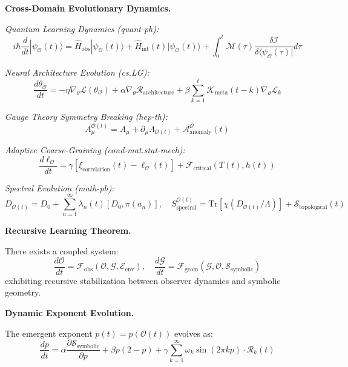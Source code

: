 \begin{scholium}
\vspace{1em}
\noindent\textbf{Cross-Domain Evolutionary Dynamics.}

\textit{Quantum Learning Dynamics (quant-ph):}
\[
i\hbar \frac{d}{dt}|\psi_{\mathcal{O}}(t)\rangle = \hat{H}_{\text{obs}}|\psi_{\mathcal{O}}(t)\rangle + \hat{H}_{\text{int}}(t)|\psi_{\mathcal{O}}(t)\rangle + \int_0^t \mathcal{M}(\tau) \frac{\delta \mathcal{I}}{\delta \langle \psi_{\mathcal{O}}(\tau)|} d\tau
\]

\textit{Neural Architecture Evolution (cs.LG):}
\[
\frac{d\theta_{\mathcal{O}}}{dt} = -\eta \nabla_\theta \mathcal{L}(\theta_{\mathcal{O}}) + \alpha \nabla_\theta \mathcal{R}_{\text{architecture}} + \beta \sum_{k=1}^{t} \mathcal{K}_{\text{meta}}(t-k) \nabla_\theta \mathcal{L}_k
\]

\textit{Gauge Theory Symmetry Breaking (hep-th):}
\[
A_\mu^{\mathcal{O}(t)} = A_\mu + \partial_\mu \Lambda_{\mathcal{O}(t)} + \mathcal{A}_{\text{anomaly}}^{\mathcal{O}}(t)
\]

\textit{Adaptive Coarse-Graining (cond-mat.stat-mech):}
\[
\frac{d\ell_{\mathcal{O}}}{dt} = \gamma[\xi_{\text{correlation}}(t) - \ell_{\mathcal{O}}(t)] + \mathcal{F}_{\text{critical}}(T(t), h(t))
\]

\textit{Spectral Evolution (math-ph):}
\[
D_{\mathcal{O}(t)} = D_0 + \sum_{n=1}^{\infty} \lambda_n(t) [D_0, \pi(a_n)], \quad S_{\text{spectral}}^{\mathcal{O}(t)} = \text{Tr}[\chi(D_{\mathcal{O}(t)}/\Lambda)] + \mathcal{S}_{\text{topological}}(t)
\]

\vspace{1em}
\noindent\textbf{Recursive Learning Theorem.}

\begin{theorem}
\label{thm:bk4_observer_geometry_coevolution}
There exists a coupled system:
\[
\frac{d\mathcal{O}}{dt} = \mathcal{F}_{\text{obs}}(\mathcal{O}, \mathcal{G}, \mathcal{E}_{\text{env}}), \quad \frac{d\mathcal{G}}{dt} = \mathcal{F}_{\text{geom}}(\mathcal{G}, \mathcal{O}, \mathcal{S}_{\text{symbolic}})
\]
exhibiting recursive stabilization between observer dynamics and symbolic geometry.
\end{theorem}

\vspace{1em}
\noindent\textbf{Dynamic Exponent Evolution.}

The emergent exponent $p(t) = p(\mathcal{O}(t))$ evolves as:
\[
\frac{dp}{dt} = \alpha \frac{\partial \mathcal{S}_{\text{symbolic}}}{\partial p} + \beta p(2-p) + \gamma \sum_{k=1}^{\infty} \omega_k \sin(2\pi k p) \cdot \mathcal{R}_k(t)
\]


\end{scholium}
